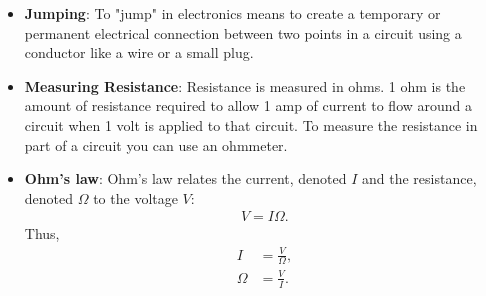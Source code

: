 \documentclass{report}
\begin{document}
\begin{itemize}
            The amount of resistance provided by a wire increases as:
            \begin{itemize}
                \item the length of the wire increases, and
                \item the thickness of the wire decreases.
            \end{itemize}
            This means that a long thin copper wire will have a tendency to provide more resistance than a short fat copper wire. However, in the experiments we carry out in this book, the jump wires have a very little resistance and as such their resistance value can be ignored.
            \bigbreak \noindent 
            \textbf{Note:} Wires are made of metal, and the atoms inside metals naturally form positive ions because of the way they bond together.
            \bigbreak \noindent 
            When electrons flow through a wire they sometimes bump into ions, which make it more difficult for the electrons to flow, causing resistance. In a long wire, this is more likely to happen than in a short wire. Likewise, in a thin wire, there are fewer electrons to carry the current than in a thick wire.
            \bigbreak \noindent 
            A thin wire has a smaller cross-sectional area, meaning it has less physical space inside to hold free electrons than a thick wire.
        \item \textbf{Jumping}: To "jump" in electronics means to create a temporary or permanent electrical connection between two points in a circuit using a conductor like a wire or a small plug.
        \item \textbf{Measuring Resistance}: Resistance is measured in ohms. 1 ohm is the amount of resistance required to allow 1 amp of current to flow around a circuit when 1 volt is applied to that circuit.
            \bigbreak \noindent 
            To measure the resistance in part of a circuit you can use an ohmmeter.
        \item \textbf{Ohm's law}: Ohm's law relates the current, denoted $I$ and the resistance, denoted $\Omega$ to the voltage $V$:
            \begin{align*}
                V = I\Omega
            .\end{align*}
            Thus, 
            \begin{align*}
                I &= \frac{V}{\Omega}, \\
                \Omega &= \frac{V}{I}
            .\end{align*}

\end{itemize}
\end{document}
